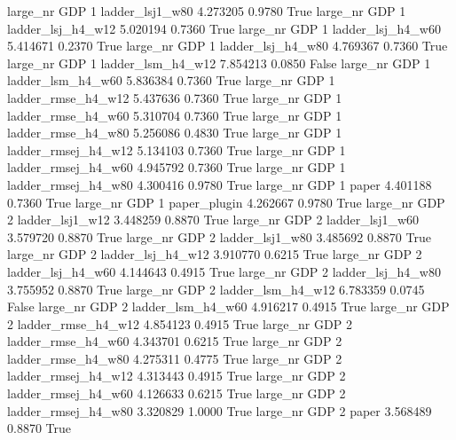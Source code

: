   large_nr      GDP                 1     ladder_lsj1_w80    4.273205      0.9780    True
  large_nr      GDP                 1   ladder_lsj_h4_w12    5.020194      0.7360    True
  large_nr      GDP                 1   ladder_lsj_h4_w60    5.414671      0.2370    True
  large_nr      GDP                 1   ladder_lsj_h4_w80    4.769367      0.7360    True
  large_nr      GDP                 1   ladder_lsm_h4_w12    7.854213      0.0850   False
  large_nr      GDP                 1   ladder_lsm_h4_w60    5.836384      0.7360    True
  large_nr      GDP                 1  ladder_rmse_h4_w12    5.437636      0.7360    True
  large_nr      GDP                 1  ladder_rmse_h4_w60    5.310704      0.7360    True
  large_nr      GDP                 1  ladder_rmse_h4_w80    5.256086      0.4830    True
  large_nr      GDP                 1 ladder_rmsej_h4_w12    5.134103      0.7360    True
  large_nr      GDP                 1 ladder_rmsej_h4_w60    4.945792      0.7360    True
  large_nr      GDP                 1 ladder_rmsej_h4_w80    4.300416      0.9780    True
  large_nr      GDP                 1               paper    4.401188      0.7360    True
  large_nr      GDP                 1        paper_plugin    4.262667      0.9780    True
  large_nr      GDP                 2     ladder_lsj1_w12    3.448259      0.8870    True
  large_nr      GDP                 2     ladder_lsj1_w60    3.579720      0.8870    True
  large_nr      GDP                 2     ladder_lsj1_w80    3.485692      0.8870    True
  large_nr      GDP                 2   ladder_lsj_h4_w12    3.910770      0.6215    True
  large_nr      GDP                 2   ladder_lsj_h4_w60    4.144643      0.4915    True
  large_nr      GDP                 2   ladder_lsj_h4_w80    3.755952      0.8870    True
  large_nr      GDP                 2   ladder_lsm_h4_w12    6.783359      0.0745   False
  large_nr      GDP                 2   ladder_lsm_h4_w60    4.916217      0.4915    True
  large_nr      GDP                 2  ladder_rmse_h4_w12    4.854123      0.4915    True
  large_nr      GDP                 2  ladder_rmse_h4_w60    4.343701      0.6215    True
  large_nr      GDP                 2  ladder_rmse_h4_w80    4.275311      0.4775    True
  large_nr      GDP                 2 ladder_rmsej_h4_w12    4.313443      0.4915    True
  large_nr      GDP                 2 ladder_rmsej_h4_w60    4.126633      0.6215    True
  large_nr      GDP                 2 ladder_rmsej_h4_w80    3.320829      1.0000    True
  large_nr      GDP                 2               paper    3.568489      0.8870    True
